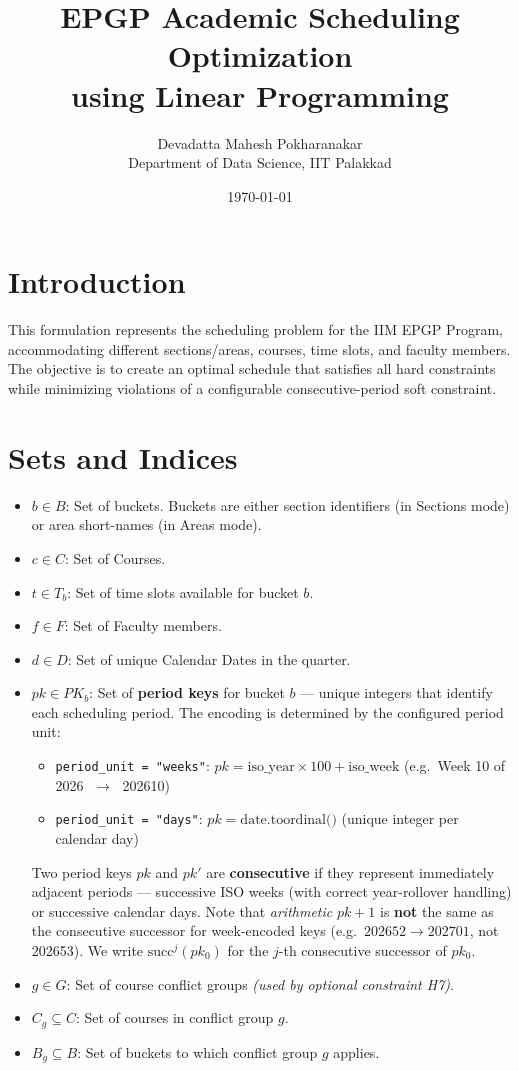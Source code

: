 \documentclass{article}
\title{EPGP Academic Scheduling Optimization\\ using Linear Programming}
\author{Devadatta Mahesh Pokharanakar\\Department of Data Science, IIT Palakkad}
\date{\today}
\begin{document}
\maketitle

\section*{Introduction}
This formulation represents the scheduling problem for the IIM EPGP Program, accommodating different sections/areas, courses, time slots, and faculty members. The objective is to create an optimal schedule that satisfies all hard constraints while minimizing violations of a configurable consecutive-period soft constraint.

\section{Sets and Indices}
\begin{itemize}
    \item $b \in B$: Set of buckets. Buckets are either section identifiers (in Sections mode) or area short-names (in Areas mode).
    \item $c \in C$: Set of Courses.
    \item $t \in T_b$: Set of time slots available for bucket $b$.
    \item $f \in F$: Set of Faculty members.
    \item $d \in D$: Set of unique Calendar Dates in the quarter.
    \item $pk \in PK_b$: Set of \textbf{period keys} for bucket $b$ — unique integers that identify each scheduling period. The encoding is determined by the configured period unit:
    \begin{itemize}
        \item \texttt{period\_unit = "weeks"}:
              $pk = \text{iso\_year} \times 100 + \text{iso\_week}$
              \quad (e.g.\ Week 10 of 2026 $\;\rightarrow\;$ 202610)
        \item \texttt{period\_unit = "days"}:
              $pk = \text{date.toordinal()}$
              \quad (unique integer per calendar day)
    \end{itemize}
    Two period keys $pk$ and $pk'$ are \textbf{consecutive} if they represent immediately adjacent periods — successive ISO weeks (with correct year-rollover handling) or successive calendar days. Note that \emph{arithmetic} $pk + 1$ is \textbf{not} the same as the consecutive successor for week-encoded keys (e.g.\ $202652 \to 202701$, not 202653). We write $\mathrm{succ}^j(pk_0)$ for the $j$-th consecutive successor of $pk_0$.
    \item $g \in G$: Set of course conflict groups \quad \emph{(used by optional constraint H7)}.
    \item $C_g \subseteq C$: Set of courses in conflict group $g$.
    \item $B_g \subseteq B$: Set of buckets to which conflict group $g$ applies.
\end{itemize}
\end{document}

